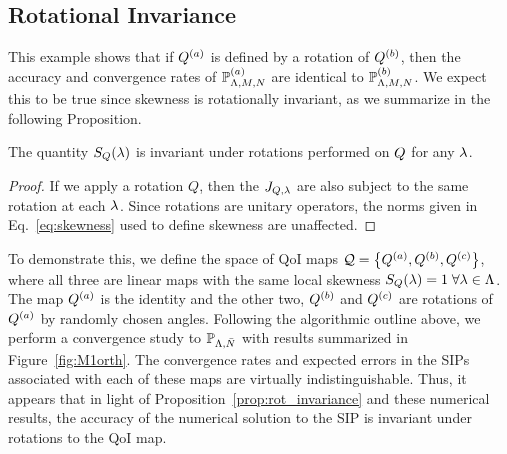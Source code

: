 \subsection{Rotational Invariance}\label{ex:rotation}
This example shows that if $Q^{(a)}$ is defined by a rotation of $Q^{(b)}$, then the accuracy and convergence rates of $\mathbb{P}^{(a)}_{{\Lambda}, M, N}$ are identical to $\mathbb{P}^{(b)}_{{\Lambda}, M, N}$. 
We expect this to be true since skewness is rotationally invariant, as we summarize in the following Proposition. 
\begin{prop}
The quantity $S_Q(\lambda)$ is invariant under rotations performed on $Q$ for any $\lambda$. \\
\label{prop:rot_invariance}
\end{prop}
\begin{proof}
If we apply a rotation $Q$, then the $J_{Q, \lambda}$ are also subject to the same rotation at each $\lambda$. 
Since rotations are unitary operators, the norms given in Eq.~\eqref{eq:skewness} used to define skewness are unaffected.
\end{proof}

To demonstrate this, we define the space of QoI maps $\mathcal{Q} = \left\{ Q^{(a)} , Q^{(b)}, Q^{(c)} \right\}$, where all three are linear maps with the same local skewness $S_Q (\lambda) = 1 \; \forall \lambda \in {\Lambda}$. 
The map $Q^{(a)}$ is the identity and the other two, $Q^{(b)}$ and $Q^{(c)}$ are rotations of $Q^{(a)}$ by randomly chosen angles.
Following the algorithmic outline above, we perform a convergence study to $\mathbb{P}_{{\Lambda},\bar{N}}$ with results summarized in Figure~\ref{fig:M1orth}.
The convergence rates and expected errors in the SIPs associated with each of these maps are virtually indistinguishable. 
Thus, it appears that in light of Proposition~\ref{prop:rot_invariance} and these numerical results, the accuracy of the numerical solution to the SIP is invariant under rotations to the QoI map.


